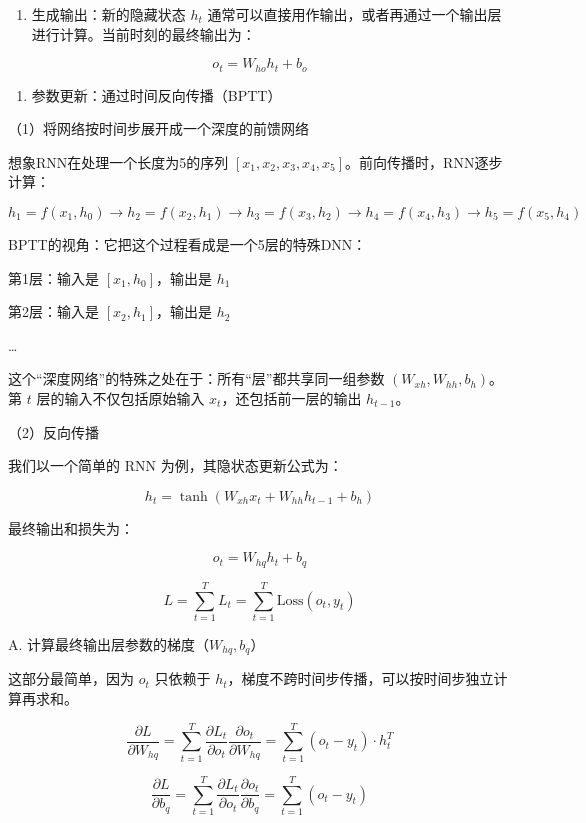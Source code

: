 \begin{enumerate}
\def\labelenumi{\arabic{enumi}.}
\setcounter{enumi}{1}
\tightlist
\item
  生成输出：新的隐藏状态 \(h_t\) 通常可以直接用作输出，或者再通过一个输出层进行计算。当前时刻的最终输出为：
\end{enumerate}

\[
o_t=W_{ho}h_t+b_o
\]

\begin{enumerate}
\def\labelenumi{\arabic{enumi}.}
\setcounter{enumi}{2}
\tightlist
\item
  参数更新：通过时间反向传播（BPTT）
\end{enumerate}

（1）将网络按时间步展开成一个深度的前馈网络

想象RNN在处理一个长度为5的序列 \([x_1,x_2,x_3,x_4,x_5]\)。前向传播时，RNN逐步计算：

\[
h_1=f(x_1,h_0)\to h_2=f(x_2,h_1)\to h_3=f(x_3,h_2)\to h_4=f(x_4,h_3)\to h_5=f(x_5,h_4)
\]

BPTT的视角：它把这个过程看成是一个5层的特殊DNN：

第1层：输入是 \([x_1,h_0]\)，输出是 \(h_1\)

第2层：输入是 \([x_2,h_1]\)，输出是 \(h_2\)

\ldots{}

这个``深度网络''的特殊之处在于：所有``层''都共享同一组参数 \((W_{xh}, W_{hh}, b_h)\)。第 \(t\) 层的输入不仅包括原始输入 \(x_t\)，还包括前一层的输出 \(h_{t-1}\)。

（2）反向传播

我们以一个简单的 RNN 为例，其隐状态更新公式为：

\[
h_t = \tanh(W_{xh}x_t + W_{hh}h_{t-1} + b_h)
\]

最终输出和损失为：

\[
o_t = W_{hq}h_t + b_q
\]

\[
L = \sum_{t=1}^{T} L_t = \sum_{t=1}^{T} \mathrm{Loss}(o_t, y_t)
\]

A. 计算最终输出层参数的梯度（\(W_{hq}, b_q\)）

这部分最简单，因为 \(o_t\) 只依赖于 \(h_t\)，梯度不跨时间步传播，可以按时间步独立计算再求和。

\[
\frac{\partial L}{\partial W_{hq}}
= \sum_{t=1}^{T} \frac{\partial L_t}{\partial o_t}\frac{\partial o_t}{\partial W_{hq}}
= \sum_{t=1}^{T}(o_t - y_t) \cdot h_t^T
\]

\[
\frac{\partial L}{\partial b_q}
= \sum_{t=1}^{T} \frac{\partial L_t}{\partial o_t}\frac{\partial o_t}{\partial b_q}
= \sum_{t=1}^{T}(o_t - y_t)
\]

